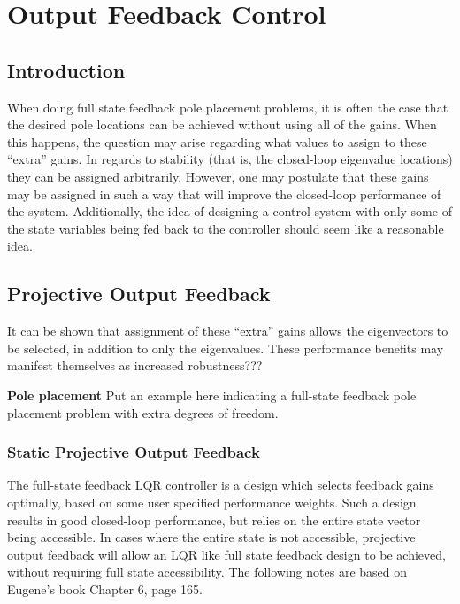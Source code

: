 \chapter{Output Feedback Control}

\section{Introduction}

When doing full state feedback pole placement problems, it is often the case that the desired pole locations can be achieved without using all of the gains.
When this happens, the question may arise regarding what values to assign to these ``extra'' gains.
In regards to stability (that is, the closed-loop eigenvalue locations) they can be assigned arbitrarily.
However, one may postulate that these gains may be assigned in such a way that will improve the closed-loop performance of the system.
Additionally, the idea of designing a control system with only some of the state variables being fed back to the controller should seem like a reasonable idea.

\section{Projective Output Feedback}

It can be shown that assignment of these ``extra'' gains allows the eigenvectors to be selected, in addition to only the eigenvalues.
These performance benefits may manifest themselves as increased robustness???

\begin{example}
  \textbf{Pole placement}
  Put an example here indicating a full-state feedback pole placement problem with extra degrees of freedom.
\end{example}

\subsection{Static Projective Output Feedback}


The full-state feedback LQR controller is a design which selects feedback gains optimally, based on some user specified performance weights.
Such a design results in good closed-loop performance, but relies on the entire state vector being accessible.
In cases where the entire state is not accessible, projective output feedback will allow an LQR like full state feedback design to be achieved, without requiring full state accessibility.
The following notes are based on Eugene's book Chapter 6, page 165.

